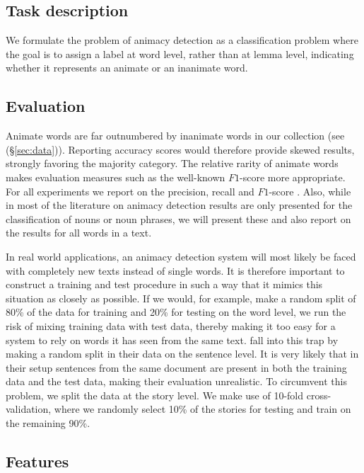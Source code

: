\documentclass[a4paper,UKenglish]{oasics}
\begin{document}
\subsection{Task description}

We formulate the problem of animacy detection as a classification
problem where the goal is to assign a label at word level, rather than
at lemma level, indicating whether it represents an animate or an
inanimate word.

\subsection{Evaluation}

Animate words are far outnumbered by inanimate words in our collection
(see (\S\ref{sec:data})). Reporting accuracy scores would therefore
provide skewed results, strongly favoring the majority category. The
relative rarity of animate words makes evaluation measures such as the
well-known $F1$-score more appropriate. For all experiments we report
on the precision, recall and $F1$-score \cite{rijsbergen:79}. Also,
while in most of the literature on animacy detection results are only
presented for the classification of nouns or noun phrases, we will
present these and also report on the results for all words in a text.

In real world applications, an animacy detection system will most
likely be faced with completely new texts instead of single words. It
is therefore important to construct a training and test procedure in
such a way that it mimics this situation as closely as possible. If we
would, for example, make a random split of 80\% of the data for
training and 20\% for testing on the word level, we run the risk of
mixing training data with test data, thereby making it too easy for a
system to rely on words it has seen from the same
text. \cite{bowman:12} fall into this trap by making a random split in
their data on the sentence level. It is very likely that in their
setup sentences from the same document are present in both the
training data and the test data, making their evaluation
unrealistic. To circumvent this problem, we split the data at the
story level. We make use of 10-fold cross-validation, where we
randomly select 10\% of the stories for testing and train on the
remaining 90\%.

\subsection{Features}
\end{document}
